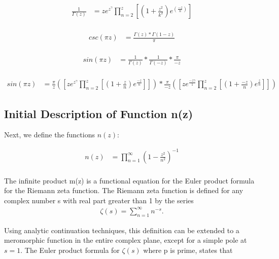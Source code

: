\documentclass{article}
\begin{document}
\begin{align*}
\frac{1}{\Gamma\left(z\right)} &= ze^z^\gamma \prod_{n=2}^z\left[\left(1 + \frac{z^2}{k^2}\right)e^\left(\frac{-z}{n}\right)\right] \\
\end{align*}

\begin{align*}
csc(\pi z) &= \frac{\Gamma\left(z\right) * \Gamma\left(1 - z\right)}{\pi} \\
\end{align*}

\begin{align*}
sin(\pi z) &= \frac{1}{\Gamma\left(z\right)} * \frac{1}{\Gamma\left(- z\right)} * \frac{\pi}{-z} \\
\end{align*}

\begin{align*}
sin(\pi z) &= \frac{\pi}{z} \left(\left[ze^z^\gamma \prod_{n=2}^z \left[\left(1 + \frac{z}{n}\right)e^\frac{-z}{n}\right]\right]\right) * \frac{\pi}{-z} \left(\left[ze^\frac{-z\gamma}{1} \prod_{n=2}^z \left[\left(1 + \frac{-z}{n}\right)e^\frac{z}{n}\right]\right]\right)
\end{align*}

\newpage
\subsection*{Initial Description of Function n(z)}
Next, we define the functions $n(z)$:

\begin{align*}
n(z) &= \prod_{n=1}^\infty \left(1 - \frac{z^2}{n^2}\right)^{-1} \\
\end{align*}

The infinite product m(z) is a functional equation for the Euler product formula for the Riemann zeta function. The Riemann zeta function is defined for any complex number s with real part greater than 1 by the series \\

\begin{align*}
\zeta(s) = \sum_{n=1}^\infty n^{-s}.
\end{align*}

Using analytic continuation techniques, this definition can be extended to a meromorphic function in the entire complex plane, except for a simple pole at $s=1$. The Euler product formula for $\zeta\left(s\right)$ where p is prime, states that \\
\end{document}
